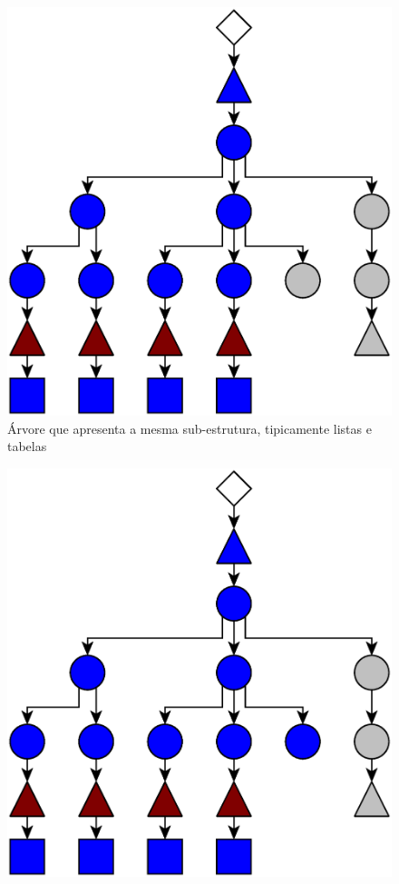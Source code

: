 \documentclass{beamer}
\newenvironment{my_itemize}{
\begin{itemize}
  \setlength{\itemsep}{5pt}
  \setlength{\parskip}{2pt}
  \setlength{\parsep}{3pt}
}{\end{itemize}}
\begin{document}
\begin{frame}[allowframebreaks]
\begin{my_itemize}
\begin{figure}[h]
    \includegraphics[scale=0.25]{img/tree1}
    \caption{Árvore que apresenta a mesma sub-estrutura, tipicamente listas e tabelas}
\end{figure}
\newpage
\begin{figure}[h]
    \includegraphics[scale=0.25]{img/tree2}

\end{figure}
\end{my_itemize}
\end{frame}
\end{document}
